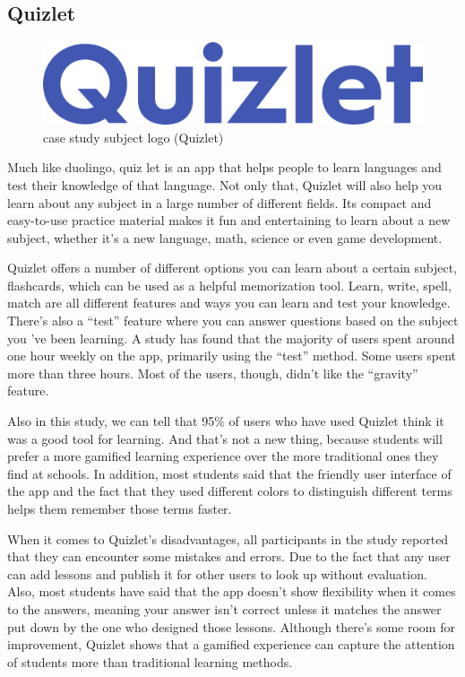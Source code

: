 \documentclass[../main.tex]{subfiles}
\begin{document}
\subsection{Quizlet}

\begin{figure}[!ht]
\centering
\includegraphics[scale=0.07]{images/chapter2/image5.png}
\caption{case study subject logo (Quizlet)}
\label{case study subject logo (Quizlet)}
\end{figure}

Much like duolingo, quiz let is an app that helps people to learn languages and test their knowledge of that language. Not only that, Quizlet will also help you learn about any subject in a large number of different fields. Its compact and easy-to-use practice material makes it fun and entertaining to learn about a new subject, whether it’s a new language, math, science or even game development. 

Quizlet offers a number of different options you can learn about a certain subject, flashcards, which can be used as a helpful memorization tool. Learn, write, spell, match are all different features and ways you can learn and test your knowledge. There’s also a “test” feature where you can answer questions based on the subject you ’ve been learning. A study has found that the majority of users spent around one hour weekly on the app, primarily using the “test” method. Some users spent more than three hours. Most of the users, though, didn’t like the “gravity” feature. 

Also in this study, we can tell that 95\% of users who have used Quizlet think it was a good tool for learning. And that’s not a new thing, because students will prefer a more gamified learning experience over the more traditional ones they find at schools. In addition, most students said that the friendly user interface of the app and the fact that they used different colors to distinguish different terms helps them remember those terms faster. 

When it comes to Quizlet’s disadvantages, all participants in the study reported that they can encounter some mistakes and errors. Due to the fact that any user can add lessons and publish it for other users to look up without evaluation. Also, most students have said that the app doesn’t show flexibility when it comes to the answers, meaning your answer isn’t correct unless it matches the answer put down by the one who designed those lessons. Although there’s some room for improvement, Quizlet shows that a gamified experience can capture the attention of students more than traditional learning methods. \cite{31}
\end{document}
